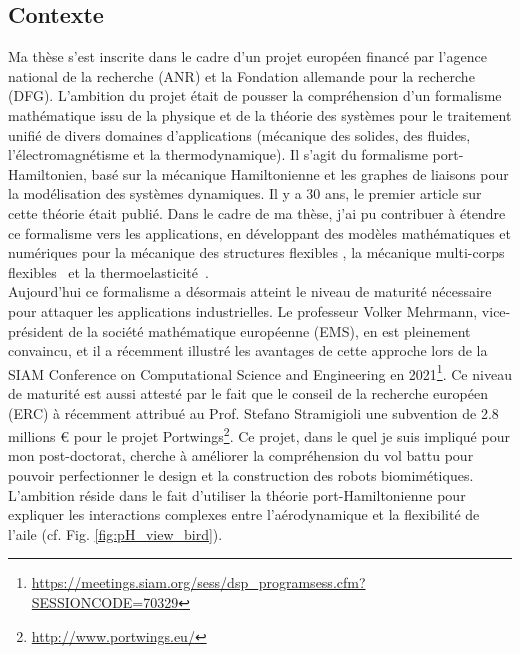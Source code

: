 \documentclass[french]{article}
\begin{document}
\subsection{Contexte}


Ma thèse s'est inscrite dans le cadre d'un projet européen financé par l'agence national de la recherche (ANR) et la Fondation allemande pour la recherche (DFG). L'ambition du projet était de pousser la compréhension d'un formalisme mathématique issu de la physique et de la théorie des systèmes pour le traitement unifié de divers domaines d'applications (mécanique des solides, des fluides, l'électromagnétisme et la thermodynamique). Il s'agit du formalisme port-Hamiltonien, bas\'e sur la mécanique Hamiltonienne et les graphes de liaisons pour la modélisation des systèmes dynamiques. Il y a 30 ans, le premier article sur cette théorie était publié. Dans le cadre de ma thèse, j'ai pu contribuer \`a étendre ce formalisme vers les applications, en développant des modèles mathématiques et numériques pour la mécanique des structures flexibles \cite{brugnoli2019ammmin,brugnoli2019ammkir}, la mécanique multi-corps flexibles~\cite{brugnoli2020msd} et la thermoelasticit\'e~\cite{brugnoli2021ther}. \\

Aujourd'hui ce formalisme a désormais atteint le niveau de maturit\'e nécessaire pour attaquer les applications industrielles. Le professeur Volker Mehrmann, vice-président de la société mathématique européenne (EMS), en est pleinement convaincu, et il a récemment illustré les avantages de cette approche  lors de la SIAM Conference on Computational Science and Engineering en 2021\footnote{\url{https://meetings.siam.org/sess/dsp_programsess.cfm?SESSIONCODE=70329}}. Ce niveau de maturit\'e est aussi attesté par le fait que le conseil de la recherche européen (ERC) \`a récemment attribu\'e au Prof. Stefano Stramigioli une subvention de 2.8 millions \euro{} pour le projet Portwings\footnote{\url{http://www.portwings.eu/}}. Ce projet, dans le quel je suis impliqu\'e pour mon post-doctorat, cherche \`a améliorer la compréhension du vol battu pour pouvoir perfectionner le design et la construction des robots biomimétiques. L'ambition réside dans le fait d'utiliser la théorie port-Hamiltonienne pour expliquer les interactions complexes entre l'aérodynamique et la flexibilit\'e de l'aile (cf. Fig. \ref{fig:pH_view_bird}). \\
\end{document}
